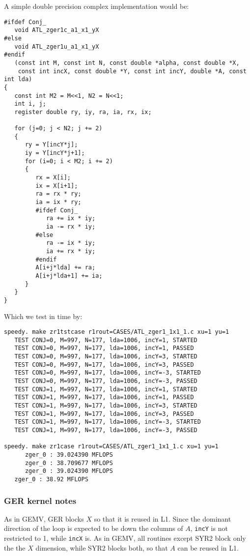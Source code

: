 \documentclass[11pt]{article}
\begin{document}
A simple double precision complex implementation would be:
\begin{verbatim}
#ifdef Conj_
   void ATL_zger1c_a1_x1_yX
#else
   void ATL_zger1u_a1_x1_yX
#endif
   (const int M, const int N, const double *alpha, const double *X, 
    const int incX, const double *Y, const int incY, double *A, const int lda)
{
   const int M2 = M<<1, N2 = N<<1;
   int i, j;
   register double ry, iy, ra, ia, rx, ix;

   for (j=0; j < N2; j += 2)
   {
      ry = Y[incY*j];
      iy = Y[incY*j+1];
      for (i=0; i < M2; i += 2)
      {
         rx = X[i];
         ix = X[i+1];
         ra = rx * ry;
         ia = ix * ry;
         #ifdef Conj_
            ra += ix * iy;
            ia -= rx * iy;
         #else
            ra -= ix * iy;
            ia += rx * iy;
         #endif
         A[i+j*lda] += ra;
         A[i+j*lda+1] += ia;
      }
   }
}
\end{verbatim}

Which we test in time by:
\begin{verbatim}
speedy. make zr1tstcase r1rout=CASES/ATL_zger1_1x1_1.c xu=1 yu=1
   TEST CONJ=0, M=997, N=177, lda=1006, incY=1, STARTED
   TEST CONJ=0, M=997, N=177, lda=1006, incY=1, PASSED
   TEST CONJ=0, M=997, N=177, lda=1006, incY=3, STARTED
   TEST CONJ=0, M=997, N=177, lda=1006, incY=3, PASSED
   TEST CONJ=0, M=997, N=177, lda=1006, incY=-3, STARTED
   TEST CONJ=0, M=997, N=177, lda=1006, incY=-3, PASSED
   TEST CONJ=1, M=997, N=177, lda=1006, incY=1, STARTED
   TEST CONJ=1, M=997, N=177, lda=1006, incY=1, PASSED
   TEST CONJ=1, M=997, N=177, lda=1006, incY=3, STARTED
   TEST CONJ=1, M=997, N=177, lda=1006, incY=3, PASSED
   TEST CONJ=1, M=997, N=177, lda=1006, incY=-3, STARTED
   TEST CONJ=1, M=997, N=177, lda=1006, incY=-3, PASSED

speedy. make zr1case r1rout=CASES/ATL_zger1_1x1_1.c xu=1 yu=1
      zger_0 : 39.024390 MFLOPS
      zger_0 : 38.709677 MFLOPS
      zger_0 : 39.024390 MFLOPS
   zger_0 : 38.92 MFLOPS
\end{verbatim}

\subsubsection{GER kernel notes}

As in GEMV, GER blocks $X$ so that it is reused in L1.  Since the
dominant direction of the loop is expected to be down the columns of
$A$, {\tt incY} is not restricted to 1, while {\tt incX} is.  As in GEMV,
all routines except SYR2 block only the the $X$ dimension, while
SYR2 blocks both, so that $A$ can be reused in L1.
\end{document}
